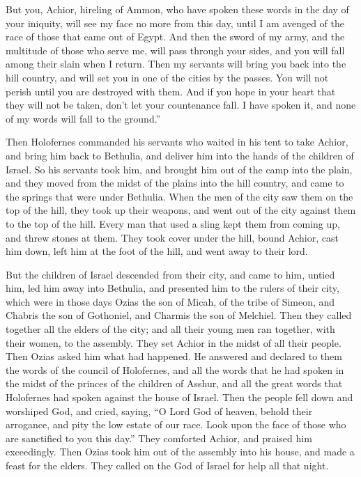  But you, Achior, hireling of Ammon, who have spoken these
words in the day of your iniquity, will see my face no more from this
day, until I am avenged of the race of those that came out of Egypt.
 And then the sword of my army, and the multitude of those
who serve me, will pass through your sides, and you will fall among
their slain when I return.  Then my servants will bring
you back into the hill country, and will set you in one of the cities by
the passes.  You will not perish until you are destroyed
with them.  And if you hope in your heart that they will
not be taken, don't let your countenance fall. I have spoken it, and
none of my words will fall to the ground.''

 Then Holofernes commanded his servants who waited in his
tent to take Achior, and bring him back to Bethulia, and deliver him
into the hands of the children of Israel.  So his
servants took him, and brought him out of the camp into the plain, and
they moved from the midst of the plains into the hill country, and came
to the springs that were under Bethulia.  When the men of
the city saw them on the top of the hill, they took up their weapons,
and went out of the city against them to the top of the hill. Every man
that used a sling kept them from coming up, and threw stones at them.
 They took cover under the hill, bound Achior, cast him
down, left him at the foot of the hill, and went away to their lord.

 But the children of Israel descended from their city,
and came to him, untied him, led him away into Bethulia, and presented
him to the rulers of their city,  which were in those
days Ozias the son of Micah, of the tribe of Simeon, and Chabris the son
of Gothoniel, and Charmis the son of Melchiel.  Then they
called together all the elders of the city; and all their young men ran
together, with their women, to the assembly. They set Achior in the
midst of all their people. Then Ozias asked him what had happened.
 He answered and declared to them the words of the
council of Holofernes, and all the words that he had spoken in the midst
of the princes of the children of Asshur, and all the great words that
Holofernes had spoken against the house of Israel.  Then
the people fell down and worshiped God, and cried, saying,
 ``O Lord God of heaven, behold their arrogance, and pity
the low estate of our race. Look upon the face of those who are
sanctified to you this day.''  They comforted Achior, and
praised him exceedingly.  Then Ozias took him out of the
assembly into his house, and made a feast for the elders. They called on
the God of Israel for help all that night.

